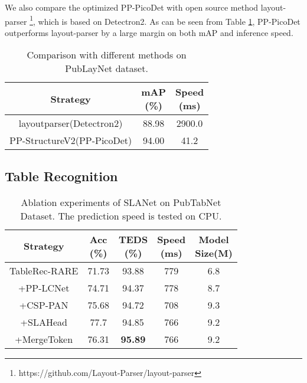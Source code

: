 \documentclass[letterpaper]{article} \usepackage{aaai21}  \usepackage{times}  \usepackage{helvet} \usepackage{courier}  \usepackage[hyphens]{url}  \usepackage{graphicx} \usepackage{algorithm}
\begin{document}
We also compare the optimized PP-PicoDet with open source method layout-parser \footnote{https://github.com/Layout-Parser/layout-parser}, which is based on Detectron2. As can be seen from Table \ref{SOTA_PubLayNet}, PP-PicoDet outperforms layout-parser by a large margin on both mAP and inference speed.

\begin{table}[t]
\begin{center}
\begin{tabular}{c|c|c}
\hline
Strategy & \makecell{mAP \\ (\%)} & \makecell{Speed \\ (ms)} \\
\hline

layoutparser(Detectron2) &	88.98 &	2900.0 \\
PP-StructureV2(PP-PicoDet) & 94.00 &  41.2 \\

\hline
\end{tabular}
\end{center}
\caption{Comparison with different methods on PubLayNet dataset.}
\label{SOTA_PubLayNet}
\end{table}


\subsection{Table Recognition}

\begin{table}[t]
\begin{center}
\begin{tabular}{c|c|c|c|c}
\hline
Strategy & \makecell{Acc \\ (\%)} & \makecell{TEDS \\ (\%)} & \makecell{Speed \\ (ms)} &  \makecell{Model \\ Size(M)}\\
\hline

TableRec-RARE &	71.73 &	93.88 &	779 &	6.8 \\
+PP-LCNet  &	74.71 &	94.37 &	778 &	8.7 \\
+CSP-PAN  &	75.68 &	94.72 &	708 &	9.3 \\
+SLAHead  &	77.7 &	94.85 &	766 &	9.2 \\
+MergeToken & 76.31 &	\textbf{95.89} &	766 &	9.2 \\

\hline
\end{tabular}
\end{center}
\caption{Ablation experiments of SLANet on PubTabNet Dataset. The prediction speed is tested on CPU.}
\label{Ablation_SLANet}
\end{table}
\end{document}
